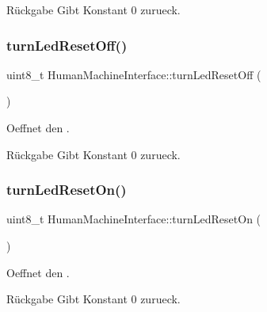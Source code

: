 \begin{DoxyReturn}{Rückgabe}
Gibt Konstant 0 zurueck. 
\end{DoxyReturn}
\hypertarget{class_human_machine_interface_a446ad469f8c9f2717d12cc69ea68598f}{}\label{class_human_machine_interface_a446ad469f8c9f2717d12cc69ea68598f} 
\subsubsection{\texorpdfstring{turn\+Led\+Reset\+Off()}{turnLedResetOff()}}
{\footnotesize\ttfamily uint8\+\_\+t Human\+Machine\+Interface\+::turn\+Led\+Reset\+Off (\begin{DoxyParamCaption}{ }\end{DoxyParamCaption})}

Oeffnet den .

\begin{DoxyReturn}{Rückgabe}
Gibt Konstant 0 zurueck. 
\end{DoxyReturn}
\hypertarget{class_human_machine_interface_aecc34d7d1e3edbe2ed38e3808da65455}{}\label{class_human_machine_interface_aecc34d7d1e3edbe2ed38e3808da65455} 
\subsubsection{\texorpdfstring{turn\+Led\+Reset\+On()}{turnLedResetOn()}}
{\footnotesize\ttfamily uint8\+\_\+t Human\+Machine\+Interface\+::turn\+Led\+Reset\+On (\begin{DoxyParamCaption}{ }\end{DoxyParamCaption})}

Oeffnet den .

\begin{DoxyReturn}{Rückgabe}
Gibt Konstant 0 zurueck. 
\end{DoxyReturn}
\hypertarget{class_human_machine_interface_a235557e9ae72f14a4db72bab675eaae1}{}\label{class_human_machine_interface_a235557e9ae72f14a4db72bab675eaae1} 
